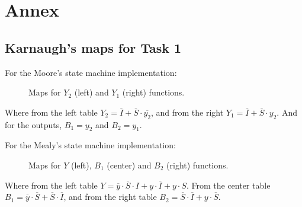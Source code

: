 


\section*{Annex}
\subsection*{Karnaugh's maps for Task 1}
For the Moore's state machine implementation:
\begin{figure}[H]
    \begin{center}
    \begin{Karnaugh}
    \end{Karnaugh}
    \begin{Karnaugh}
    \end{Karnaugh}
    \caption{Maps for $Y_2$ (left) and $Y_1$ (right) functions.}
    \end{center}
    \end{figure}
    
    Where from the left table $Y_2 = \overline{I} + \overline{S} \cdot \overline{y_2}$, 
    and from the right $Y_1 = \overline{I} + \overline{S} \cdot y_2$. And for
    the outputs, $B_1 = y_2$ and $B_2 = y_1$. 

For the Mealy's state machine implementation:

\begin{figure}[H]
    \begin{center}
         \begin{Karnaughvuit}
         \end{Karnaughvuit}
         \begin{Karnaughvuit}
         \end{Karnaughvuit}
         \begin{Karnaughvuit}
         \end{Karnaughvuit}
         \caption{Maps for $Y$ (left), $B_1$ (center) and $B_2$ (right) functions.}
    \end{center}
    \end{figure}
    Where from the left table $Y = \overline{y} \cdot \overline{S} \cdot I + y \cdot \overline{I} + y \cdot S$. 
    From the center table $B_1 = \overline{y} \cdot \overline{S} + \overline{S} \cdot \overline{I}$, and from the 
    right table $B_2 = \overline{S} \cdot \overline{I} + y \cdot \overline{S}$.
